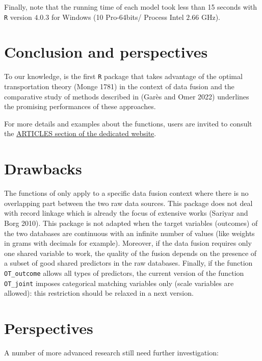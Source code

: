 Finally, note that the running time of each model took less than 15 seconds with \texttt{R} version \(4.0.3\) for Windows (10 Pro-64bits/ Process Intel \(2.66\) GHz).

\hypertarget{conclusion-and-perspectives}{%
\section{Conclusion and perspectives}\label{conclusion-and-perspectives}}

To our knowledge,  is the first \texttt{R} package that takes advantage of the optimal transportation theory (Monge 1781) in the context of data fusion and the comparative study of methods described in (Garès and Omer 2022) underlines the promising performances of these approaches.

For more details and examples about the functions, users are invited to consult the \href{https://otrecoding.github.io/OTrecod/}{ARTICLES section of the dedicated website}.

\hypertarget{drawbacks}{%
\section{Drawbacks}\label{drawbacks}}

The functions of  only apply to a specific data fusion context where there is no overlapping part between the two raw data sources. This package does not deal with record linkage which is already the focus of extensive works (Sariyar and Borg 2010). This package is not adapted when the target variables (outcomes) of the two databases are continuous with an infinite number of values (like weights in grams with decimals for example). Moreover, if the data fusion requires only one shared variable to work, the quality of the fusion depends on the presence of a subset of good shared predictors in the raw databases. Finally, if the function \texttt{OT\_outcome} allows all types of predictors, the current version of the function \texttt{OT\_joint} imposes categorical matching variables only (scale variables are allowed): this restriction should be relaxed in a next version.

\hypertarget{perspectives}{%
\section{Perspectives}\label{perspectives}}

A number of more advanced research still need further investigation:

